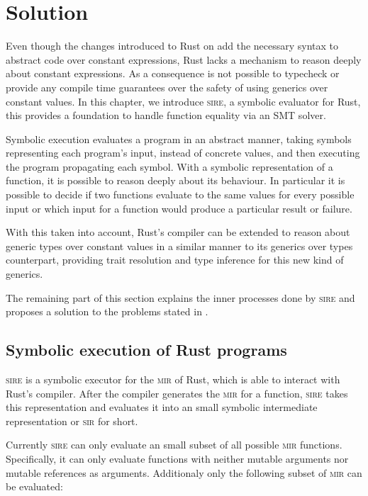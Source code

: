 \chapter{Solution}
\label{chap:solution}

Even though the changes introduced to Rust on  add the
necessary syntax to abstract code over constant expressions, Rust lacks a
mechanism to reason deeply about constant expressions. As a consequence is not
possible to typecheck or provide any compile time guarantees over the safety of
using generics over constant values. In this chapter, we introduce
\textsc{sire}, a symbolic evaluator for Rust, this provides a foundation to
handle function equality via an SMT solver. 

Symbolic execution evaluates a program in an abstract manner, taking symbols
representing each program's input, instead of concrete values, and then
executing the program propagating each symbol. With a symbolic
representation of a function, it is possible to reason deeply about its
behaviour. In particular it is possible to decide if two functions evaluate to
the same values for every possible input or which input for a function would
produce a particular result or failure.

With this taken into account, Rust's compiler can be extended to reason about
generic types over constant values in a similar manner to its generics over
types counterpart, providing trait resolution and type inference for this new
kind of generics.

The remaining part of this section explains the inner processes done by
\textsc{sire} and proposes a solution to the problems stated in
.

\section{Symbolic execution of Rust programs}
\label{sec:symbolic_execution}

\textsc{sire} is a symbolic executor for the \textsc{mir} of Rust, which is
able to interact with Rust's compiler. After the compiler generates the
\textsc{mir} for a function, \textsc{sire} takes this representation and
evaluates it into an small symbolic intermediate representation or \textsc{sir}
for short.

Currently \textsc{sire} can only evaluate an small subset of all possible
\textsc{mir} functions. Specifically, it can only evaluate functions with
neither mutable arguments nor mutable references as arguments. Additionaly only
the following subset of \textsc{mir} can be evaluated:

